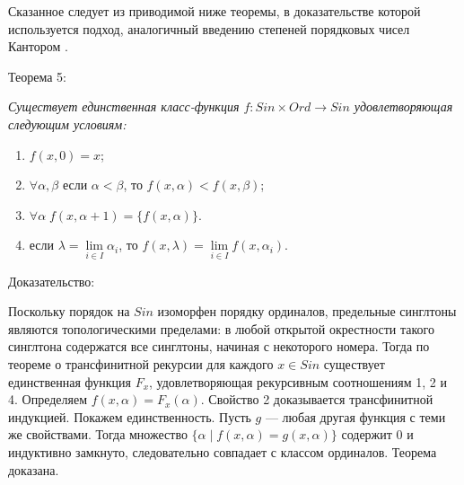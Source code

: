 \documentclass[12pt]{article}
\begin{document}
Сказанное следует из приводимой ниже теоремы, в доказательстве которой используется подход, аналогичный введению степеней порядковых чисел Кантором \cite{cantor-power}. 

Теорема 5: {\sl Существует единственная класс-функция $f : Sin \times Ord \to Sin$ удовлетворяющая следующим условиям: 
\begin{enumerate}
    \item $f(x, 0) = x$;
    \item $\forall \alpha, \beta$ если $\alpha < \beta$, то $f(x, \alpha) < f(x, \beta)$;
    \item $\forall \alpha \; f(x, \alpha + 1) = \{ f(x, \alpha) \}$.
    \item если $\lambda = \lim\limits_{i \in I} \alpha_i$, то $f(x, \lambda) = \lim\limits_{i \in I} f(x, \alpha_i)$.
\end{enumerate}}

Доказательство: 

Поскольку порядок на $Sin$ изоморфен порядку ординалов, предельные синглтоны являются топологическими пределами: в любой открытой окрестности такого синглтона содержатся все синглтоны, начиная с некоторого номера. Тогда по теореме о трансфинитной рекурсии для каждого $x \in Sin$ существует единственная функция $F_x$, удовлетворяющая рекурсивным соотношениям 1, 2 и 4. Определяем $f(x, \alpha) = F_x(\alpha)$. Свойство 2 доказывается трансфинитной индукцией. Покажем единственность. Пусть $g$ — любая другая функция с теми же свойствами. Тогда множество $\{\alpha \mid f(x, \alpha) = g(x, \alpha)\}$ содержит 0 и индуктивно замкнуто, следовательно совпадает с классом ординалов. Теорема доказана.
\end{document}
